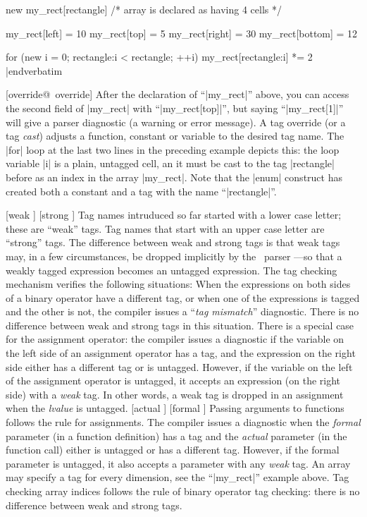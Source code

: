 new my_rect[rectangle]          /* array is declared as having 4 cells */

my_rect[left] = 10
my_rect[top] = 5
my_rect[right] = 30
my_rect[bottom] = 12

for (new i = 0; rectangle:i < rectangle; ++i)
    my_rect[rectangle:i] *= 2
|endverbatim\endlistingx

[override@\midtilde\ override] 
After the declaration of ``|my_rect|'' above, you can access the second field
of |my_rect| with ``|my_rect[top]|'', but saying ``|my_rect[1]|'' will give a
parser diagnostic (a warning or error message). A tag override (or a
tag {\it cast}) adjusts a function, constant or variable to the desired
tag name. The |for| loop at the last two lines in the preceding example depicts
this: the loop variable |i| is a plain, untagged cell, an it must be cast to
the tag |rectangle| before as an index in the array |my_rect|. Note that
the |enum| construct has created both a constant and a tag with the name
``|rectangle|''.

[weak \midtilde] [strong \midtilde]
Tag names intruduced so far started with a lower case letter; these are ``weak''
tags. Tag names that start with an upper case letter are ``strong'' tags. The
difference between weak and strong tags is that weak tags may, in a few circumstances,
be dropped implicitly by the \Small\ parser ---so that a weakly tagged expression
becomes an untagged expression. The tag checking mechanism verifies the following
situations:
\beginlist{1em} \compactlist
\list{\lbullet}
  When the expressions on both sides of a binary operator have a different tag,
  or when one of the expressions is tagged and the other is not, the compiler
  issues a ``{\it tag mismatch\/}'' diagnostic. There is no difference between
  weak and strong tags in this situation.
\list{\lbullet}
   
  There is a special case for the assignment operator: the compiler issues a
  diagnostic if the variable on the left side of an assignment operator has a tag, and
  the expression on the right side either has a different tag or is untagged.
  However, if the variable on the left of the assignment operator is untagged, it accepts
  an expression (on the right side) with a {\it weak\/} tag. In other words, a
  weak tag is dropped in an assignment when the {\it lvalue\/} is untagged.
\list{\lbullet}
   [actual \midtilde]  [formal \midtilde]
  Passing arguments to functions follows the rule for assignments. The compiler
  issues a diagnostic when the {\it formal\/} parameter (in a function
  definition) has a tag and the {\it actual\/} parameter (in the function call)
  either is untagged or has a different tag. However, if the formal parameter
  is untagged, it also accepts a parameter with any {\it weak\/} tag.
\list{\lbullet}
  An array may specify a tag for every dimension, see the ``|my_rect|'' example
  above. Tag checking array indices follows the rule of binary operator tag
  checking: there is no difference between weak and strong tags.
\endlist

